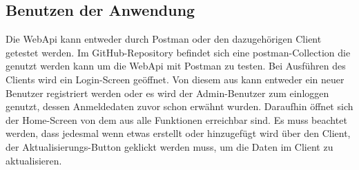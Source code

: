 \subsection{Benutzen der Anwendung}
Die WebApi kann entweder durch Postman oder den dazugehörigen Client getestet werden. Im GitHub-Repository befindet sich eine postman-Collection die genutzt werden kann um die WebApi mit Postman zu testen.
\newline Bei Ausführen des Clients wird ein Login-Screen geöffnet. Von diesem aus kann entweder ein neuer Benutzer registriert werden oder es wird der Admin-Benutzer zum einloggen genutzt, dessen Anmeldedaten zuvor schon erwähnt wurden. 
Daraufhin öffnet sich der Home-Screen von dem aus alle Funktionen erreichbar sind. 
\newline Es muss beachtet werden, dass jedesmal wenn etwas erstellt oder hinzugefügt wird über den Client, der Aktualisierungs-Button geklickt werden muss, um die Daten im Client zu aktualisieren.